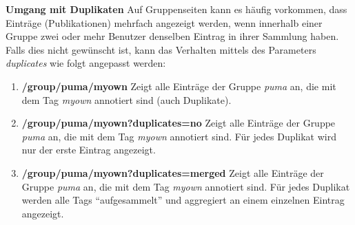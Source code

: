 \textbf{Umgang mit Duplikaten}\newline
Auf Gruppenseiten kann es häufig vorkommen, dass Einträge (Publikationen) mehrfach angezeigt werden, wenn innerhalb einer Gruppe zwei oder mehr Benutzer denselben Eintrag in ihrer Sammlung haben.\newline
Falls dies nicht gewünscht ist, kann das Verhalten mittels des Parameters \textit{duplicates} wie folgt angepasst werden:
\begin{enumerate}
    \item \textbf{/group/puma/myown} \newline
    Zeigt alle Einträge der Gruppe \textit{puma} an, die mit dem Tag \textit{myown} annotiert sind (auch Duplikate).
    \item \textbf{/group/puma/myown?duplicates=no} \newline
    Zeigt alle Einträge der Gruppe \textit{puma} an, die mit dem Tag \textit{myown} annotiert sind. Für jedes Duplikat wird nur der erste Eintrag angezeigt.
    \item \textbf{/group/puma/myown?duplicates=merged} \newline
    Zeigt alle Einträge der Gruppe \textit{puma} an, die mit dem Tag \textit{myown} annotiert sind. Für jedes Duplikat werden alle Tags \enquote{aufgesammelt} und aggregiert an einem einzelnen Eintrag angezeigt.
\end{enumerate}


